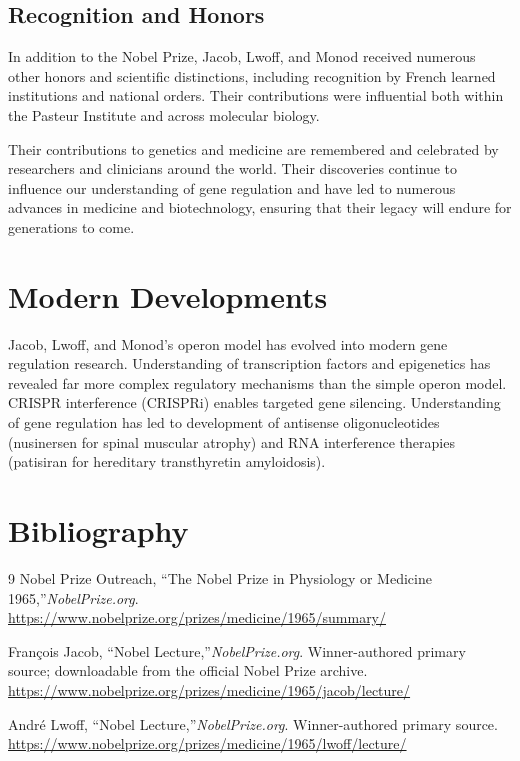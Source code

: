 \subsection{Recognition and Honors}

In addition to the Nobel Prize, Jacob, Lwoff, and Monod received numerous other honors and scientific distinctions, including recognition by French learned institutions and national orders. Their contributions were influential both within the Pasteur Institute and across molecular biology.

Their contributions to genetics and medicine are remembered and celebrated by researchers and clinicians around the world. Their discoveries continue to influence our understanding of gene regulation and have led to numerous advances in medicine and biotechnology, ensuring that their legacy will endure for generations to come.


\section{Modern Developments}

Jacob, Lwoff, and Monod's operon model has evolved into modern gene regulation research. Understanding of transcription factors and epigenetics has revealed far more complex regulatory mechanisms than the simple operon model. CRISPR interference (CRISPRi) enables targeted gene silencing. Understanding of gene regulation has led to development of antisense oligonucleotides (nusinersen for spinal muscular atrophy) and RNA interference therapies (patisiran for hereditary transthyretin amyloidosis).


\section{Bibliography}

\begin{thebibliography}{9}
Nobel Prize Outreach, ``The Nobel Prize in Physiology or Medicine 1965,''\emph{NobelPrize.org}.\\
\url{https://www.nobelprize.org/prizes/medicine/1965/summary/}

Fran\c{c}ois Jacob, ``Nobel Lecture,''\emph{NobelPrize.org}. Winner-authored primary source; downloadable from the official Nobel Prize archive.\\
\url{https://www.nobelprize.org/prizes/medicine/1965/jacob/lecture/}

Andr\'e Lwoff, ``Nobel Lecture,''\emph{NobelPrize.org}. Winner-authored primary source.\\
\url{https://www.nobelprize.org/prizes/medicine/1965/lwoff/lecture/}
\end{thebibliography}
